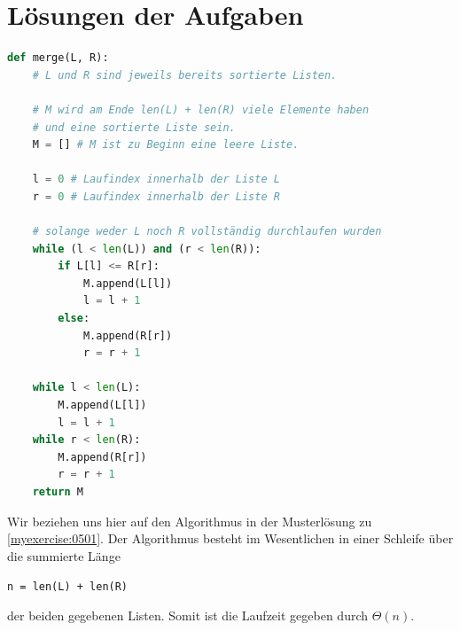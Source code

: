 \section{Lösungen der Aufgaben}
\begin{myanswer}[myexercise:0501]
	\begin{lstlisting}[language=Python,caption=Implementation der Funktion \lstinline|merge|,label=listing:merge]
def merge(L, R):
    # L und R sind jeweils bereits sortierte Listen.

    # M wird am Ende len(L) + len(R) viele Elemente haben
    # und eine sortierte Liste sein.
    M = [] # M ist zu Beginn eine leere Liste.

    l = 0 # Laufindex innerhalb der Liste L
    r = 0 # Laufindex innerhalb der Liste R

    # solange weder L noch R vollständig durchlaufen wurden
    while (l < len(L)) and (r < len(R)):
        if L[l] <= R[r]:
            M.append(L[l])
            l = l + 1
        else:
            M.append(R[r])
            r = r + 1

    while l < len(L):
        M.append(L[l])
        l = l + 1
    while r < len(R):
        M.append(R[r])
        r = r + 1
    return M
\end{lstlisting}
\end{myanswer}

\begin{myanswer}[myexercise:0502]
	Wir beziehen uns hier auf den Algorithmus in der Musterlösung zu \cref{myexercise:0501}. Der Algorithmus besteht im Wesentlichen in einer Schleife über die summierte Länge
	\begin{center}
		\lstinline|n = len(L) + len(R)|
	\end{center}
	der beiden gegebenen Listen. Somit ist die Laufzeit gegeben durch $\Theta(n)$.
\end{myanswer}


